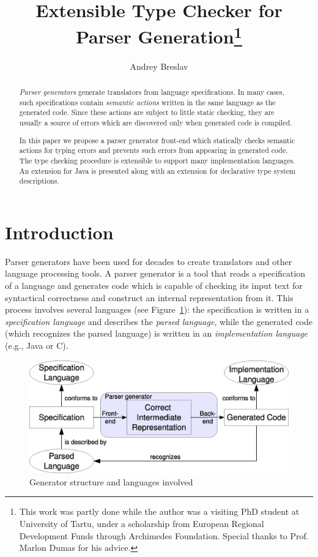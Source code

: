 \documentclass{llncs2e/llncs}
\newcommand{\figref}[1]{Figure~\ref{#1}}
\begin{document}
\title{Extensible Type Checker for Parser Generation\thanks{This work was partly done while the author was a visiting PhD student at University of Tartu, under a scholarship from European Regional Development Funds through Archimedes Foundation. Special thanks to Prof. Marlon Dumas for his advice.}}
\author{Andrey Breslav\\
}
\maketitle
%
\begin{abstract}
	\emph{Parser generators} generate translators from language specifications. In many cases, such specifications contain \emph{semantic actions} written in the same language as the generated code. Since these actions are subject to little static checking, they are usually a source of errors which are discovered only when generated code is compiled.

	In this paper we propose a parser generator front-end which statically checks semantic actions for typing errors and prevents such errors from appearing in generated code. The type checking procedure is extensible to support many implementation languages. An extension for Java is presented along with an extension for declarative type system descriptions.
\end{abstract}



\section{Introduction}\label{Introduction}

Parser generators have been used for decades to create translators and other language processing tools.
A parser generator is a tool that reads a specification of a language and generates code which is capable of checking its input text for syntactical correctness and construct an internal representation from it. This process involves several languages (see \figref{languages}): the specification is written in a \emph{specification language} and describes the \emph{parsed language}, while the generated code (which recognizes the parsed language) is written in an \emph{implementation language} (e.g., Java or C). 

\begin{figure}[h!]
		\centering
		\includegraphics[width=.8\textwidth]{languages}
		\caption{Generator structure and languages involved}\label{languages}
\end{figure}
\end{document}
